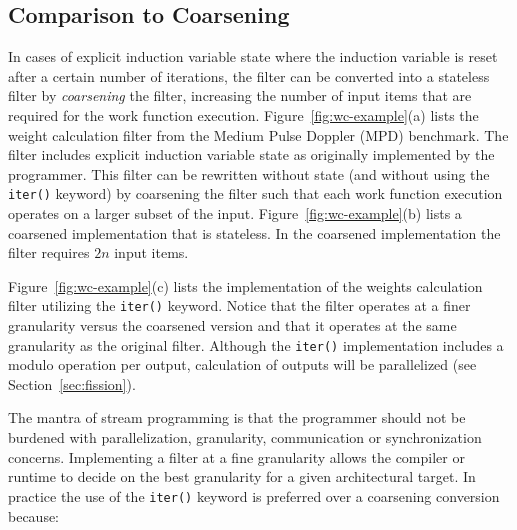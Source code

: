 \subsection{Comparison to Coarsening}
\label{sec:coarsen}






In cases of explicit induction variable state where the induction
variable is reset after a certain number of iterations, the filter can
be converted into a stateless filter by {\it coarsening} the filter,
increasing the number of input items that are required for the work
function execution.  Figure~\ref{fig:wc-example}(a) lists the weight
calculation filter from the Medium Pulse Doppler (MPD) benchmark.  The
filter includes explicit induction variable state as originally
implemented by the programmer.  This filter can be rewritten without
state (and without using the {\tt iter()} keyword) by coarsening the
filter such that each work function execution operates on a larger
subset of the input.  Figure~\ref{fig:wc-example}(b) lists a coarsened
implementation that is stateless.  In the coarsened implementation the
filter requires $2n$ input items.

Figure~\ref{fig:wc-example}(c) lists the implementation of the weights
calculation filter utilizing the {\tt iter()} keyword.  Notice that
the filter operates at a finer granularity versus the coarsened
version and that it operates at the same granularity as the original
filter.  Although the {\tt iter()} implementation includes a modulo
operation per output, calculation of outputs will be parallelized
(see Section~\ref{sec:fission}).

The mantra of stream programming is that the programmer should not be
burdened with parallelization, granularity, communication or
synchronization concerns.  Implementing a filter at a fine granularity
allows the compiler or runtime to decide on the best granularity for a
given architectural target.  In practice the use of the {\tt iter()}
keyword is preferred over a coarsening conversion because:

